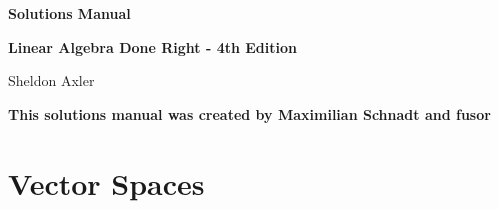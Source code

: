 \documentclass[11pt, b5paper, draft, fleqn]{book}
\theoremstyle{remark}
\begin{document}
\begin{titlepage}	
	\begin{center}
	
	\huge
	\textbf{Solutions Manual}
    
	\vspace{2em}
	\Large
	\textbf{Linear Algebra Done Right - 4th Edition}
    
	Sheldon Axler
	
	\vspace{2em}
	\large
	\textbf{This solutions manual was created by Maximilian Schnadt and fusor}
	
	\end{center}
\end{titlepage}

\fancyhf{}
\cleardoublepage
{}
\setcounter{page}{3}
\tableofcontents

\cleardoublepage

\fancyhf{}
\setcounter{page}{5}
\rhead{\thepage}
\lhead{\firstleftmark}

\chapter{Vector Spaces}
\end{document}

